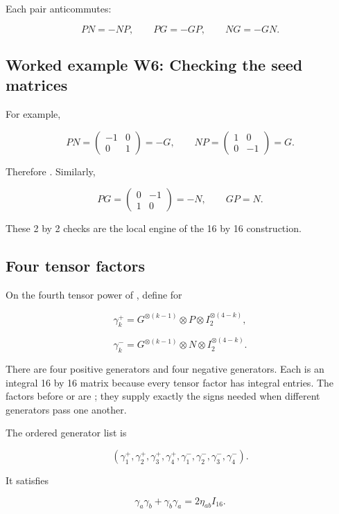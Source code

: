 \documentclass[11pt]{article}
\begin{document}
Each pair anticommutes:

\[
PN=-NP,\qquad PG=-GP,\qquad NG=-GN.
\]

\subsection{Worked example W6: Checking the seed matrices}

For example,

\[
PN=\begin{pmatrix}-1&0\\0&1\end{pmatrix}=-G,
\qquad
NP=\begin{pmatrix}1&0\\0&-1\end{pmatrix}=G.
\]

Therefore \texttt{}. Similarly,

\[
PG=\begin{pmatrix}0&-1\\1&0\end{pmatrix}=-N,
\qquad
GP=N.
\]

These 2 by 2 checks are the local engine of the 16 by 16 construction.

\subsection{Four tensor factors}

On the fourth tensor power of \texttt{}, define for \texttt{}

\[
\gamma_k^+=G^{\mathbin{\otimes}(k-1)}
\mathbin{\otimes}P\mathbin{\otimes}
I_2^{\mathbin{\otimes}(4-k)},
\]

\[
\gamma_k^-=G^{\mathbin{\otimes}(k-1)}
\mathbin{\otimes}N\mathbin{\otimes}
I_2^{\mathbin{\otimes}(4-k)}.
\]

There are four positive generators and four negative generators. Each is an integral 16 by 16 matrix because every tensor factor has integral entries. The factors before \texttt{} or \texttt{} are \texttt{}; they supply exactly the signs needed when different generators pass one another.

The ordered generator list is

\[
(\gamma_1^+,\gamma_2^+,\gamma_3^+,\gamma_4^+,
\gamma_1^-,\gamma_2^-,\gamma_3^-,\gamma_4^-).
\]

It satisfies

\[
\gamma_a\gamma_b+\gamma_b\gamma_a
=2\eta_{ab}I_{16}.
\]
\end{document}
